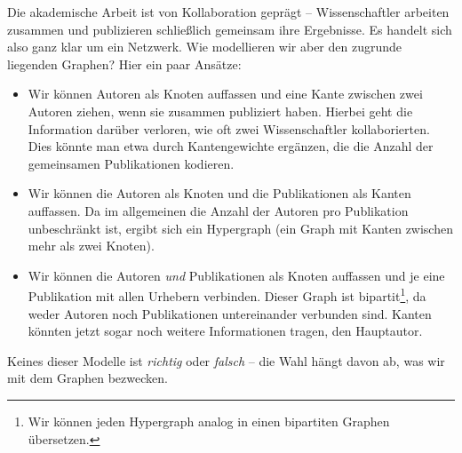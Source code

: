\begin{example}
    Die akademische Arbeit ist von Kollaboration geprägt -- Wissenschaftler arbeiten zusammen und publizieren schließlich gemeinsam ihre Ergebnisse.
    Es handelt sich also ganz klar um ein Netzwerk.
    Wie modellieren wir aber den zugrunde liegenden Graphen?
    Hier ein paar Ansätze:

    \begin{itemize}
        \item
              Wir können Autoren als Knoten auffassen und eine Kante zwischen zwei Autoren ziehen, wenn sie zusammen publiziert haben.
              Hierbei geht die Information darüber verloren, wie oft zwei Wissenschaftler kollaborierten.
              Dies könnte man etwa durch Kantengewichte ergänzen, die die Anzahl der gemeinsamen Publikationen kodieren.

        \item Wir können die Autoren als Knoten und die Publikationen als Kanten auffassen.
              Da im allgemeinen die Anzahl der Autoren pro Publikation unbeschränkt ist, ergibt sich ein Hypergraph (ein Graph mit Kanten zwischen mehr als zwei Knoten).

        \item Wir können die Autoren \emph{und} Publikationen als Knoten auffassen und je eine Publikation mit allen Urhebern verbinden.
              Dieser Graph ist bipartit\footnote{Wir können jeden Hypergraph analog in einen bipartiten Graphen übersetzen.}, da weder Autoren noch Publikationen untereinander verbunden sind.
              Kanten könnten jetzt sogar noch weitere Informationen tragen, \zB den Hauptautor.\qedhere
    \end{itemize}
\end{example}

\noindent
Keines dieser Modelle ist \emph{richtig} oder \emph{falsch} -- die Wahl hängt davon ab, was wir mit dem Graphen bezwecken.

